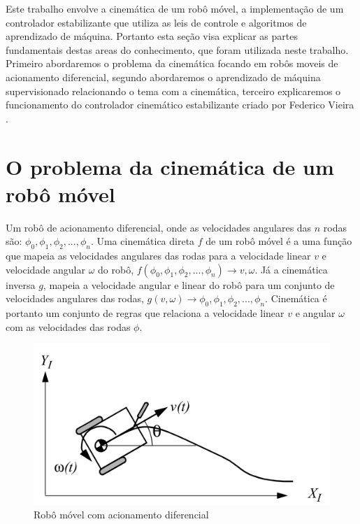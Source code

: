 
\label{Cap:Teoria}
Este trabalho envolve a cinemática de um robô móvel,
a implementação de um controlador estabilizante
que utiliza as leis de controle e
algoritmos de aprendizado de máquina. Portanto esta seção
visa explicar as partes fundamentais destas areas do conhecimento,
que foram utilizada neste trabalho. Primeiro abordaremos o problema
da cinemática focando em robôs moveis de acionamento diferencial,
segundo abordaremos o aprendizado de máquina supervisionado
relacionando o tema com a cinemática, terceiro explicaremos o
funcionamento do controlador cinemático estabilizante criado
por Federico Vieira \cite{vieira2006controle}.

\section{O problema da cinemática de um robô móvel}
Um robô de acionamento diferencial, onde as velocidades
angulares das $n$ rodas são: $\phi_0,\phi_1,\phi_2,...,\phi_n$.
Uma cinemática direta $f$ de um robô móvel é a uma função que mapeia as
velocidades
angulares das rodas para a velocidade linear $v$ e velocidade angular $\omega$
do robô, $f(\phi_0,\phi_1,\phi_2,...,\phi_n) \rightarrow v,\omega$. Já
a cinemática inversa $g$, mapeia a velocidade angular e linear do robô para
um
conjunto de velocidades angulares das rodas,
$g(v,\omega) \rightarrow  \phi_0,\phi_1,\phi_2,...,\phi_n$.
Cinemática é portanto um conjunto de regras que relaciona a velocidade
linear $v$ e angular $\omega$
com as velocidades das rodas $\phi$.

\begin{figure}[H]
    \label{fig:robo:movel:acionamento:diferencial}
    \centering
    \includegraphics[scale=0.9]{figuras/robo.png}%
    \caption{Robô móvel com acionamento diferencial}
\end{figure}

